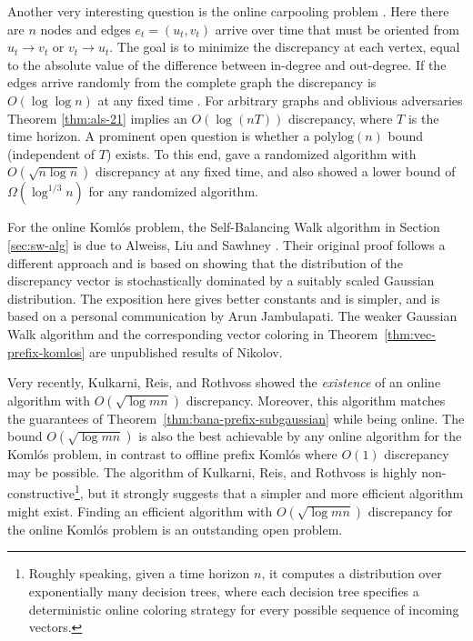 Another very interesting question is the online carpooling problem \cite{AjtaiANRSW98}. Here there are $n$ nodes
and edges $e_t=(u_t,v_t)$ arrive over time that must be oriented from
$u_t\rightarrow v_t$ or $v_t\rightarrow u_t$. The goal is to minimize
the discrepancy at each vertex, equal to the absolute value of the
difference between in-degree and out-degree.
If the edges arrive randomly from the complete graph the discrepancy is $O(\log \log n)$ at any fixed time \cite{AjtaiANRSW98}.
For arbitrary graphs and oblivious adversaries Theorem \ref{thm:als-21} implies an $O(\log (nT))$ discrepancy, where $T$ is the time horizon. 
A prominent open question is whether a $\text{polylog}(n)$ bound (independent of $T$) exists. To this end,
\cite{AjtaiANRSW98} gave a
randomized algorithm with $O(\sqrt{n \log n})$ discrepancy at any fixed time, and also showed a lower bound of $\Omega(\log^{1/3} n)$ for any randomized algorithm. 




 
For the online Koml\'{o}s problem, the Self-Balancing Walk algorithm in Section \ref{sec:sw-alg} is due to Alweiss, Liu and Sawhney  \cite{alweiss2020discrepancy}. Their original proof
follows a different approach and is based on showing that the distribution of the discrepancy vector is stochastically dominated by a suitably scaled Gaussian distribution. The exposition here gives better constants and is simpler, and is based on a personal communication by Arun Jambulapati. The weaker Gaussian Walk algorithm and the corresponding vector coloring in Theorem~\ref{thm:vec-prefix-komlos} are unpublished results of Nikolov.

    Very recently, Kulkarni, Reis, and  Rothvoss \cite{rothvoss-online}
    showed the {\em existence} of an online algorithm with
    $O(\sqrt{\log mn})$ discrepancy. Moreover, this algorithm matches
    the guarantees of Theorem~\ref{thm:bana-prefix-subgaussian} while being online.
       The bound     $O(\sqrt{\log mn})$ is also the best achievable
       by any online algorithm for the Koml\'os problem, in contrast to offline prefix Koml\'{o}s where $O(1)$ discrepancy may be possible.
    The algorithm of Kulkarni, Reis, and Rothvoss is highly non-constructive\footnote{Roughly speaking, given a time horizon $n$, it computes a distribution over exponentially many decision trees, where each decision tree specifies a deterministic online coloring strategy for every possible sequence of incoming vectors.}, 
    but it strongly suggests that a simpler and more efficient algorithm might exist. 
    Finding an efficient algorithm with $O(\sqrt{\log mn})$
    discrepancy for the online Koml\'{o}s problem is an outstanding open problem. 
    
